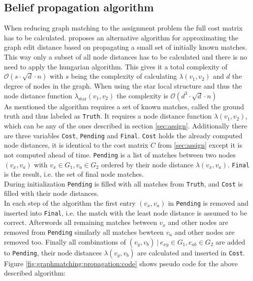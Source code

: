 \documentclass[
    12pt,                               %
    DIV=14,                     %
    parskip=half+,              %
    bigheadings,                %
    cleardoubleempty,   %
    halfparskip,                %
    ]{scrreprt} %
\begin{document}
\subsection{Belief propagation algorithm} \label{sec:beliefpropagation}
When reducing graph matching to the assignment problem the full cost matrix has to be calculated. \cite{beliefpropagation} proposes an alternative algorithm for approximating the graph edit distance based on propagating a small set of initially known matches. This way only a subset of all node distances has to be calculated and there is no need to apply the hungarian algorithm. This gives it a total complexity of $\mathcal{O}(s \cdot \sqrt{d} \cdot n)$ with $s$ being the complexity of calculating $\lambda(v_1, v_2)$ and $d$ the degree of nodes in the graph. When using the star local structure and thus the node distance function $\lambda_{\text{star}}(v_1, v_2)$ the complexity is $\mathcal{O}(d^3 \cdot \sqrt{d} \cdot n)$ \cite{beliefpropagation} \\
As mentioned the algorithm requires a set of known matches, called the ground truth and thus labeled as \verb'Truth'. It requires a node distance function $\lambda(v_1, v_2)$, which can be any of the ones described in section \ref{sec:assign}. Additionally there are three variables \verb'Cost', \verb'Pending' and \verb'Final'. \verb'Cost' holds the already computed node distances, it is identical to the cost matrix $C$ from \ref{sec:assign} except it is not computed ahead of time. \verb'Pending' is a list of matches between two nodes $(v_x, v_a)$ with $v_x \in G_1, v_a \in G_2$ ordered by their node distance $\lambda(v_x, v_a)$. \verb'Final' is the result, i.e. the set of final node matches. \\
During initialization \verb'Pending' is filled with all matches from \verb'Truth', and \verb'Cost' is filled with their node distances. \\
In each step of the algorithm the first entry $(v_x, v_a)$ in \verb'Pending' is removed and inserted into \verb'Final', i.e. the match with the least node distance is assumed to be correct. Afterwords all remaining matches between $v_x$ and other nodes are removed from \verb'Pending' similarly all matches bewteen $v_a$ and other nodes are removed too. Finally all combinations of $(v_y, v_b) \: | \: e_{xy} \in G_1, e_{ab} \in G_2$ are added to \verb'Pending', their node distances $\lambda(v_y, v_b)$ are calculated and inserted in \verb'Cost'. \\
Figure \ref{fig:graphmatching:propagation:code} shows pseudo code for the above described algorithm:
\end{document}
